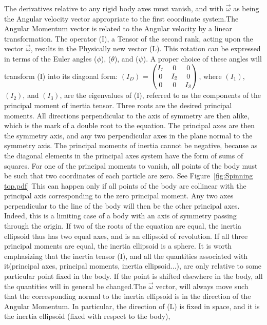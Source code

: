\documentclass[a4paper, 10pt, onepage]{elegantbook}
\begin{document}
{The derivatives relative to any rigid body axes must vanish, and with $\vec{\omega}$ as being the Angular velocity 
vector appropriate to the first coordinate system.The Angular Momentum vector is related to the Angular velocity by a 
linear transformation. The operator (I), a Tensor of the second rank, acting upon the vector $\vec{\omega}$, results in 
the Physically new vector (L). This rotation can be expressed in terms of the Euler angles ($\phi$), ($\theta$), and 
($\psi$). A proper choice of these angles will transform (I) into its diagonal form:
$(I_D)$ = $\begin{pmatrix}\mathit{I_1} & 0 & 0 \cr 0 & \mathit{I_2} & 0 \cr 0 & 0 & \mathit{I_3} \end{pmatrix}$, where 
$(I_1)$, $(I_2)$, and $(I_3)$, are the eigenvalues of (I), referred to as the components of the principal moment of 
inertia tensor. Three roots are the desired principal moments.
All directions perpendicular to the axis of symmetry are then alike, which is the mark of a double root to the 
equation. The principal axes are then the symmetry axis, and any two perpendicular axes in the plane normal to the 
symmetry axis. The principal moments of inertia cannot be negative, because as the diagonal elements in the principal 
axes system have the form of sums of squares. For one of the principal moments to vanish, all points of the body must 
be such that two coordinates of each particle are zero. See Figure~\ref{fig:Spinning top.pdf}  
This can happen only if all points of the body are collinear with the principal axis corresponding to the zero 
principal moment. Any two axes perpendicular to the line of the body will then be the other principal axes. Indeed, 
this is a limiting case of a body with an axis of symmetry passing through the origin. If two of the roots of the 
equation are equal, the inertia ellipsoid thus has two equal axes, and is an ellipsoid of revolution. If all three 
principal moments are equal, the inertia ellipsoid is a sphere.  
It is worth emphasizing that the inertia tensor (I), and all the quantities associated with it(principal axes, 
principal moments, inertia ellipsoid...), are only relative to some particular point fixed in the body. If the point is 
shifted elsewhere in the body, all the quantities will in general be changed.The $\vec{\omega}$ vector, will always 
move such that the corresponding normal to the inertia ellipsoid is in the direction of the Angular Momentum. In 
particular, the direction of (L) is fixed in space, and it is the inertia ellipsoid (fixed with respect to the body), 
}
\end{document}
